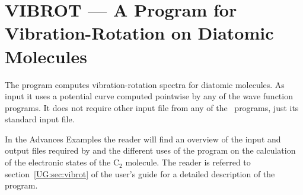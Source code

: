 \section{VIBROT --- A Program for Vibration-Rotation on Diatomic Molecules}
\label{TUT:sec:vibrot}

The program  computes vibration-rotation spectra for diatomic
molecules. As input it uses a potential curve computed pointwise by any of
the wave function programs. It does not require other input file from any
of the \molcas\ programs, just its standard input file.

In the Advances Examples the reader will find an overview of the input and
output files required by  and the different uses of the
program on the calculation of the electronic states of the C$_2$ molecule.
The reader is referred to section~\ref{UG:sec:vibrot}
of the user's guide for a detailed description of the program.
